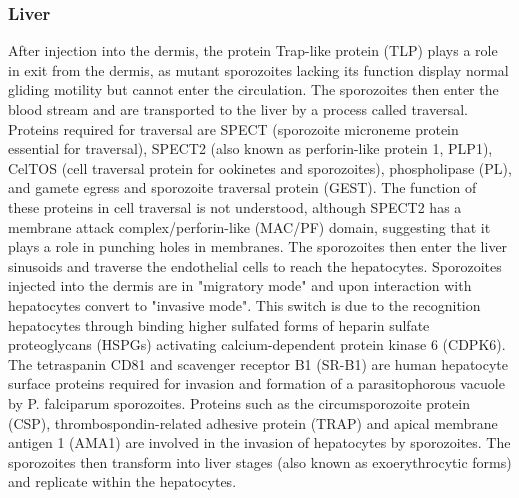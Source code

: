 \documentclass[twoside]{article}
\begin{document}
\begin{multicols}{2}
    \subsubsection*{Liver}
    After injection into the dermis, the protein Trap-like protein (TLP) plays a role in
    exit from the dermis, as mutant sporozoites lacking its function
    display normal gliding motility but cannot enter the circulation.
    The sporozoites then enter the blood stream and are transported to the liver by a process called traversal.
    Proteins required for traversal are SPECT (sporozoite microneme protein
    essential for traversal), SPECT2 (also known as perforin-like protein 1, PLP1), CelTOS (cell traversal protein for ookinetes and sporozoites),
    phospholipase (PL), and gamete egress
    and sporozoite traversal protein (GEST). The function of these
    proteins in cell traversal is not understood, although SPECT2
    has a membrane attack complex/perforin-like (MAC/PF) domain,
    suggesting that it plays a role in punching holes in membranes.
    The sporozoites then enter the liver sinusoids and traverse the
    endothelial cells to reach the hepatocytes. Sporozoites injected
    into the dermis are in "migratory mode" and upon interaction
    with hepatocytes convert to "invasive mode".
    This switch is due to the recognition  hepatocytes through binding
    higher sulfated forms of heparin sulfate proteoglycans (HSPGs)
    activating calcium-dependent protein kinase 6 (CDPK6). The tetraspanin CD81 and scavenger receptor
    B1 (SR-B1) are human hepatocyte surface proteins required
    for invasion and formation of a parasitophorous vacuole by
    P. falciparum sporozoites. Proteins such as the circumsporozoite protein (CSP), thrombospondin-related
    adhesive protein (TRAP) and apical membrane antigen 1 (AMA1)
    are involved in the invasion of hepatocytes by sporozoites. The sporozoites then
    transform into liver stages (also known as exoerythrocytic
    forms) and replicate within the hepatocytes. 

\end{multicols}
\end{document}
